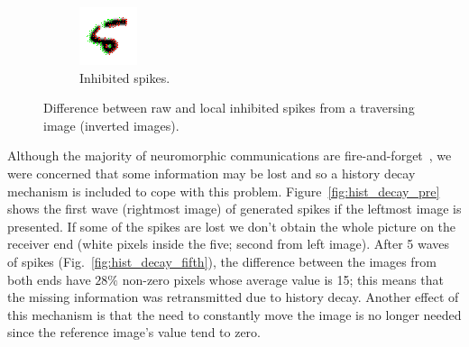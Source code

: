 \documentclass[twocolumn]{article}
\begin{document}
\begin{figure}[htb]
\begin{subfigure}[b]{0.23\textwidth}
    \includegraphics[width=\textwidth]{post_inh_frame_262}
    \caption{Inhibited spikes.}
    \label{fig:post_inh}
  \end{subfigure}


  \caption{Difference between raw and local inhibited spikes from a traversing image (inverted images).}
  \label{fig:inh_diff}
\end{figure}


Although the majority of neuromorphic communications are fire-and-forget~\cite{Rast2015}, we were concerned that some information may be lost and so a history decay mechanism is included to cope with this problem. Figure~\ref{fig:hist_decay_pre} shows the first wave (rightmost image) of generated spikes if the leftmost image is presented. If some of the spikes are lost we don't obtain the whole picture on the receiver end (white pixels inside the five; second from left image). After 5 waves of spikes (Fig.~\ref{fig:hist_decay_fifth}), the difference between the images from both ends have $28\%$ non-zero pixels whose average value is 15; this means that the missing information was retransmitted due to history decay. Another effect of this mechanism is that the need to constantly move the image is no longer needed since the reference image's value tend to zero.
\end{document}
